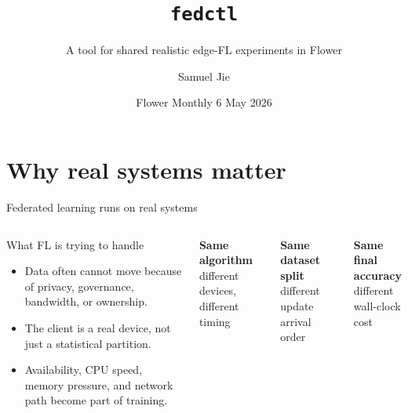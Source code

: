 \documentclass[aspectratio=169,xcolor=dvipsnames]{beamer}
\title{\texttt{fedctl}}
\subtitle{A tool for shared realistic edge-FL experiments in Flower}
\author{Samuel Jie}
\institute
{
    Department of Computer Science and Technology \\
    University of Cambridge \\
}
\date{Flower Monthly \textbar{} 6 May 2026}
\newcommand{\smallnote}[1]{{\scriptsize\color{FedctlGray}#1}}
\newcommand{\metric}[2]{\textbf{\large #1}\\[-0.1em]\smallnote{#2}}
\newcommand{\tightitems}{\setlength\itemsep{0.45em}}
\begin{document}
\begin{frame}
    \titlepage
\end{frame}

\section{Why real systems matter}

\begin{frame}{Federated learning runs on real systems}
    \begin{columns}[T,totalwidth=\textwidth]
        \begin{block}{What FL is trying to handle}
            \begin{itemize}
                \tightitems
                \item Data often cannot move because of privacy, governance, bandwidth, or ownership.
                \item The client is a real device, not just a statistical partition.
                \item Availability, CPU speed, memory pressure, and network path become part of training.
            \end{itemize}
        \end{block}

        \vspace{0.3em}
        \metric{Same algorithm}{different devices, different timing}

        \vspace{1.2em}
        \metric{Same dataset split}{different update arrival order}

        \vspace{1.2em}
        \metric{Same final accuracy}{different wall-clock cost}
    \end{columns}
\end{frame}
\end{document}
